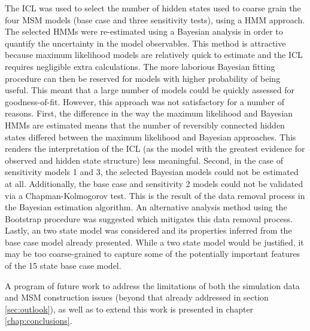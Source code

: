 The ICL was used to select the number of hidden states used to coarse grain the four MSM models (base case and three sensitivity tests), using a HMM approach. The selected HMMs were re-estimated using a Bayesian analysis in order to quantify the uncertainty in the model observables. This method is attractive because maximum likelihood models are relatively quick to estimate and the ICL requires negligible extra calculations. The more laborious Bayesian fitting procedure can then be reserved for models with higher probability of being useful. This meant that a large number of models could be quickly assessed for goodness-of-fit. However, this approach was not satisfactory for a number of reasons. First, the difference in the way the maximum likelihood and Bayesian HMMs are estimated means that the number of reversibly connected hidden states differed between the maximum likelihood and Bayesian approaches. This renders the interpretation of the ICL (as the model with the greatest evidence for observed and hidden state structure) less meaningful. Second, in the case of sensitivity models 1 and 3, the selected Bayesian models could not be estimated at all. Additionally, the base case and sensitivity 2 models could not be validated via a Chapman-Kolmogorov test. This is the result of the data removal process in the Bayesian estimation algorithm. An alternative analysis method using the Bootstrap procedure was suggested which mitigates this data removal process.  Lastly, an two state model was considered and its properties inferred from the base case model already presented.  While a two state model would be justified, it may be too coarse-grained to capture some of the potentially important features of the \num{15} state base case model.  

A program of future work to address the limitations of both the simulation data and MSM construction issues (beyond that already addressed in section \ref{sec:outlook}), as well as to extend this work is presented in chapter \ref{chap:conclusions}.  










